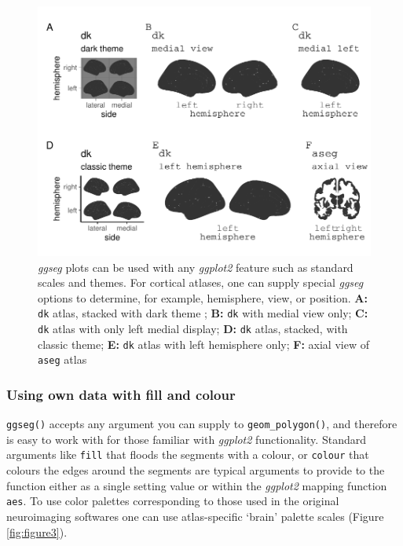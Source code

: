 \documentclass[fleqn,10pt]{wlpeerj} %
\begin{document}
\begin{figure}[H]
\includegraphics[width=1\linewidth]{msc_ggseg_files/figure-latex/figure2-1} \caption{\emph{ggseg} plots can be used with any \emph{ggplot2} feature such as standard scales and themes. For cortical atlases, one can supply special \emph{ggseg} options to determine, for example, hemisphere, view, or position. \textbf{A:} \texttt{dk} atlas, stacked with dark theme ; \textbf{B:} \texttt{dk} with medial view only; \textbf{C:} \texttt{dk} atlas with only left medial display; \textbf{D:} \texttt{dk} atlas, stacked, with classic theme; \textbf{E:} \texttt{dk} atlas with left hemisphere only; \textbf{F:} axial view of \texttt{aseg} atlas}\label{fig:figure2}
\end{figure}

\hypertarget{using-own-data-with-fill-and-colour}{%
\subsubsection{Using own data with fill and colour}\label{using-own-data-with-fill-and-colour}}

\texttt{ggseg()} accepts any argument you can supply to \texttt{geom\_polygon()}, and therefore is easy to work with for those familiar with \emph{ggplot2} functionality.
Standard arguments like \texttt{fill} that floods the segments with a colour, or \texttt{colour} that colours the edges around the segments are typical arguments to provide to the function either as a single setting value or within the \emph{ggplot2} mapping function \texttt{aes}.
To use color palettes corresponding to those used in the original neuroimaging softwares one can use atlas-specific `brain' palette scales (Figure \ref{fig:figure3}).
\end{document}

